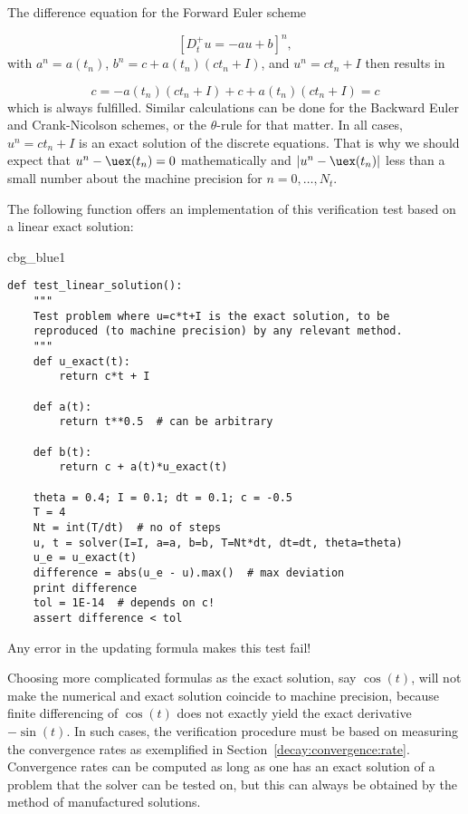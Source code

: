 \documentclass[graybox,sectrefs,envcountresetchap,open=right,final]{svmonodo}
\newenvironment{_cod_tight}[1]{
   \def\FrameCommand{\colorbox{#1}}
   \FrameRule0.6pt\MakeFramed {\FrameRestore}\vskip3mm}
   {\vskip0mm\endMakeFramed}
\newenvironment{cod}[1]{
\bgroup\rmfamily
\fboxsep=0mm\relax
\begin{_cod_tight}{#1}
\list{}{\parsep=-2mm\parskip=0mm\topsep=0pt\leftmargin=2mm
\rightmargin=2\leftmargin\leftmargin=4pt\relax}
\item\relax}
{\endlist\end{_cod_tight}\egroup}
\begin{document}
The difference equation for the Forward Euler scheme

\[ [D^+_t u = -au + b]^n, \]
with $a^n=a(t_n)$, $b^n=c + a(t_n)(ct_n + I)$, and $u^n=ct_n + I$
then results in

\[ c = -a(t_n)(ct_n+I) + c + a(t_n)(ct_n + I) = c \]
which is always fulfilled. Similar calculations can be done for the
Backward Euler and Crank-Nicolson schemes, or the $\theta$-rule for
that matter. In all cases, $u^n=ct_n +I$ is an exact solution of
the discrete equations. That is why we should expect that
$u^n - \uex(t_n) =0$ mathematically and $|u^n - \uex(t_n)|$ less
than a small number about the machine precision for $n=0,\ldots,N_t$.

The following function offers an implementation of this verification
test based on a linear exact solution:

\begin{cod}{cbg_blue1}\begin{Verbatim}[numbers=none,fontsize=\fontsize{9pt}{9pt},baselinestretch=0.95,xleftmargin=2mm]
def test_linear_solution():
    """
    Test problem where u=c*t+I is the exact solution, to be
    reproduced (to machine precision) by any relevant method.
    """
    def u_exact(t):
        return c*t + I

    def a(t):
        return t**0.5  # can be arbitrary

    def b(t):
        return c + a(t)*u_exact(t)

    theta = 0.4; I = 0.1; dt = 0.1; c = -0.5
    T = 4
    Nt = int(T/dt)  # no of steps
    u, t = solver(I=I, a=a, b=b, T=Nt*dt, dt=dt, theta=theta)
    u_e = u_exact(t)
    difference = abs(u_e - u).max()  # max deviation
    print difference
    tol = 1E-14  # depends on c!
    assert difference < tol
\end{Verbatim}
\end{cod}
\noindent
Any error in the updating formula makes this test fail!

Choosing more complicated formulas as the exact solution, say
$\cos(t)$, will not make the numerical and exact solution
coincide to machine precision, because finite differencing of
$\cos(t)$ does not exactly yield the exact derivative $-\sin(t)$.
In such cases, the verification procedure
must be based on measuring the convergence rates as exemplified in
Section~\ref{decay:convergence:rate}. Convergence rates can be
computed as long as one has
an exact solution of a problem that the solver can be tested on, but
this can always be obtained by the method of manufactured solutions.
\end{document}
